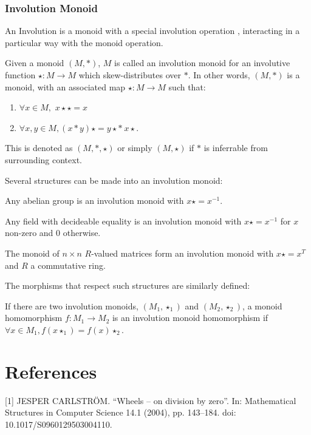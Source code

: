 \subsection{Involution Monoid}
An Involution is a monoid with a special involution operation , interacting in a particular way with the 
monoid operation.
\begin{definition}
  \leanok
  Given a monoid $(M,*)$, $M$ is called an involution monoid for an involutive function $\star:M \rightarrow M$
  which skew-distributes over $*$. In other words, $(M,*)$ is a monoid, with an associated map $\star:M \rightarrow M$
  such that:
  \begin{enumerate}
    \item $\forall x \in M,$  $x \star \star = x$ \\
    \item $\forall x, y \in M, (x * y) \star = y \star  * \: x \star$. \\
  \end{enumerate}
  This is denoted as $(M,*,\star)$ or simply $(M,\star)$ if $*$ is inferrable from surrounding context.
\end{definition}
Several structures can be made into an involution monoid:
\begin{proposition}
  \leanok
  Any abelian group is an involution monoid with $x\star = x^{-1}$.
\end{proposition}
\begin{proposition}
  \leanok
  Any field with decideable equality is an involution monoid with $x\star = x^{-1}$ for $x$ non-zero and $0$ otherwise.
\end{proposition}
\begin{proposition}
  \leanok
  The monoid of $n \times n$ $R$-valued matrices form an involution monoid with $x\star = x^{T}$ and $R$ a commutative ring.
\end{proposition}
The morphisms that respect such structures are similarly defined:
\begin{definition}
  \leanok
  If there are two involution monoids, $(M_{1},\star_{1})$ and $(M_{2},\star_{2})$, a monoid homomorphism $f : M_{1} \rightarrow M_{2}$ 
  is an involution monoid homomorphism if $\forall x ∈ M_{1}, f (x\star_{1}) = f (x)\star_{2}$.
\end{definition}
\chapter{References}
[1] JESPER CARLSTRÖM. “Wheels – on division by zero”. In: Mathematical Structures in Computer Science 14.1 (2004), pp. 143–184. doi: 10.1017/S0960129503004110.